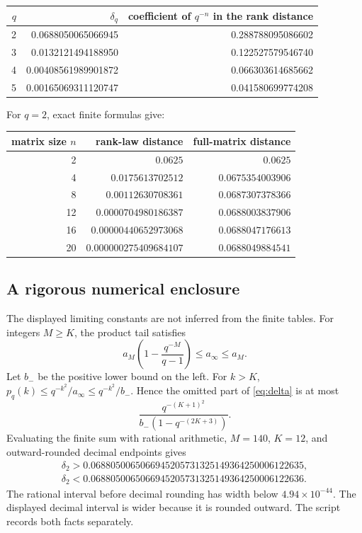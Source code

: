 \documentclass[11pt]{article}
\newcommand{\1}{\mathbf 1}
\theoremstyle{definition}
\theoremstyle{remark}
\numberwithin{equation}{section}
\begin{document}
\begin{center}
\begin{tabular}{rrr}
\toprule
$q$ & $\delta_q$ & coefficient of $q^{-n}$ in the rank distance\\
\midrule
2 & 0.0688050065066945 & 0.288788095086602\\
3 & 0.0132121494188950 & 0.122527579546740\\
4 & 0.00408561989901872 & 0.066303614685662\\
5 & 0.00165069311120747 & 0.041580699774208\\
\bottomrule
\end{tabular}
\end{center}

For $q=2$, exact finite formulas give:
\begin{center}
\begin{tabular}{rrr}
\toprule
matrix size $n$ & rank-law distance & full-matrix distance\\
\midrule
2  & $0.0625$ & $0.0625$\\
4  & $0.0175613702512$ & $0.0675354003906$\\
8  & $0.00112630708361$ & $0.0687307378366$\\
12 & $0.0000704980186387$ & $0.0688003837906$\\
16 & $0.00000440652973068$ & $0.0688047176613$\\
20 & $0.000000275409684107$ & $0.0688049884541$\\
\bottomrule
\end{tabular}
\end{center}

\subsection{A rigorous numerical enclosure}
The displayed limiting constants are not inferred from the finite tables. For integers $M\ge K$, the product tail satisfies
\[
a_M\left(1-\frac{q^{-M}}{q-1}\right)\le a_\infty\le a_M.
\]
Let $b_-$ be the positive lower bound on the left. For $k>K$,
$p_q(k)\le q^{-k^2}/a_\infty\le q^{-k^2}/b_-$. Hence the omitted part of \eqref{eq:delta} is at most
\begin{equation}\label{eq:certtail}
\frac{q^{-(K+1)^2}}{b_-(1-q^{-(2K+3)})}.
\end{equation}
Evaluating the finite sum with rational arithmetic, $M=140$, $K=12$, and outward-rounded decimal endpoints gives
\begin{gather*}
\delta_2>0.0688050065066945205731325149364250006122635,\\
\delta_2<0.0688050065066945205731325149364250006122636.
\end{gather*}
The rational interval before decimal rounding has width below $4.94\times10^{-44}$. The displayed decimal interval is wider because it is rounded outward. The script records both facts separately.
\end{document}
